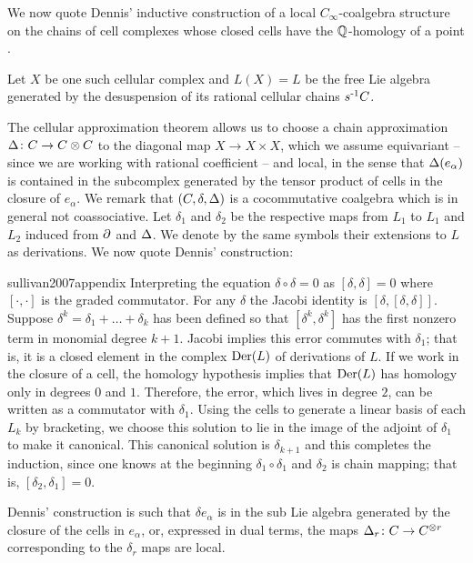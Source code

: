 We now quote Dennis' inductive construction of a local $C_\infty$-coalgebra structure on the chains of cell complexes whose closed cells have the $\mathbb{Q}$-homology of a point \cite{sullivan2007appendix}.

Let $X$ be one such cellular complex and $L(X) = L$ be the free Lie algebra generated by the desuspension of its rational cellular chains $s^{\mbox{\scriptsize -1}}C$.

The cellular approximation theorem allows us to choose a chain approximation $\operatorname{\Delta} \colon C \to C \otimes C$ to the diagonal map $X \to X \times X$, which we assume equivariant -- since we are working with rational coefficient -- and local, in the sense that $\operatorname{\Delta}(e_\alpha)$ is contained in the subcomplex generated by the tensor product of cells in the closure of $e_\alpha$.
We remark that $(C, \delta, \operatorname{\Delta})$ is a cocommutative coalgebra which is in general not coassociative.
Let $\delta_1$ and $\delta_2$ be the respective maps from $L_1$ to $L_1$ and $L_2$ induced from $\partial$ and $\operatorname{\Delta}$.
We denote by the same symbols their extensions to $L$ as derivations.
We now quote Dennis' construction:

\begin{displaycquote}[p.251]{sullivan2007appendix}
	Interpreting the equation $\delta \circ \delta = 0$ as $[\delta, \delta] = 0$ where $[\cdot, \cdot]$ is the graded commutator.
	For any $\delta$ the Jacobi identity is $[\delta, [\delta, \delta]]$.
	Suppose $\delta^k = \delta_1 + \dots + \delta_k$ has been defined so that $[\delta^k, \delta^k]$ has the first nonzero term in monomial degree $k + 1$.
	Jacobi implies this error commutes with $\delta_1$; that is, it is a closed element in the complex $\mathrm{Der}(L)$ of derivations of $L$.
	If we work in the closure of a cell, the homology hypothesis implies that $\mathrm{Der}(L)$ has homology only in degrees $0$ and $1$.
	Therefore, the error, which lives in degree $2$, can be written as a commutator with $\delta_1$.
	Using the cells to generate a linear basis of each $L_k$ by bracketing, we choose this solution to lie in the image of the adjoint of $\delta_1$ to make it canonical.
	This canonical solution is $\delta_{k+1}$ and this completes the induction, since one knows at the beginning $\delta_1 \circ \delta_1$
	and $\delta_2$ is chain mapping; that is, $[\delta_2, \delta_1] = 0$.
\end{displaycquote}

Dennis' construction is such that $\delta e_\alpha$ is in the sub Lie algebra generated by the closure of the cells in $e_\alpha$, or, expressed in dual terms, the maps $\operatorname{\Delta}_r \colon C \to C^{\otimes r}$ corresponding to the $\delta_r$ maps are local.

